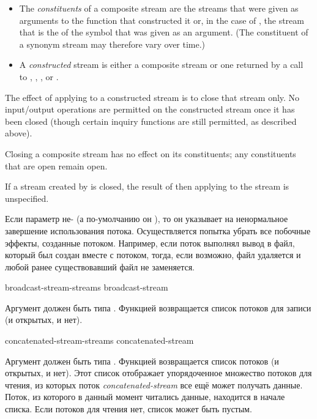 \begin{defun}[Функция]
\begin{new}
\begin{itemize}
\item
The \emph{constituents} of a composite stream are the streams that were given
as arguments to the function that constructed it or, in the case of
, the stream that is the  of
the symbol that was given as an argument.  (The constituent of
a synonym stream may therefore vary over time.)

\item
A \emph{constructed} stream is either a composite stream or one returned
by a call to , ,
, or
.
\end{itemize}

The effect of applying  to a constructed stream is to close
that stream only.  No input/output operations are permitted on the
constructed stream once it has been closed (though certain inquiry
functions are still permitted, as described above).

Closing a composite stream has no effect on its constituents;
any constituents that are open remain open.

If a stream created by  is closed,
the result of then applying  to the
stream is unspecified.
\end{new}

Если параметр  не-{\false} (а по-умолчанию он {\false}), то он
указывает на ненормальное завершение использования потока. Осуществляется
попытка убрать все побочные эффекты, созданные потоком. Например, если поток
выполнял вывод в файл, который был создан вместе с потоком, тогда, если
возможно, файл удаляется и любой ранее существовавший файл не заменяется.
\end{defun}

\begin{defun}[Функция]
broadcast-stream-streams broadcast-stream

Аргумент должен быть типа .
Функцией возвращается список потоков для записи (и открытых, и нет).
\end{defun}

\begin{defun}[Функция]
concatenated-stream-streams concatenated-stream

Аргумент должен быть типа .
Функцией возвращается список потоков (и открытых, и нет).
Этот список отображает упорядоченное множество потоков для чтения, из которых
поток \emph{concatenated-stream} все ещё может получать данные. Поток, из
которого в данный момент читались данные, находится в начале списка.
Если потоков для чтения нет, список может быть пустым.
\end{defun}


